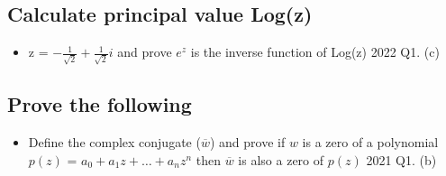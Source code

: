 \documentclass[a4paper, 10pt]{article}
\begin{document}
\subsection{Calculate principal value Log(z)}
\begin{itemize}
    \item z = $-\frac{1}{\sqrt{2}} + \frac{1}{\sqrt{2}} i$ and prove $e^z$ is the inverse function of Log(z) \hfill 2022 Q1. (c)
\end{itemize}
\subsection{Prove the following}
\begin{itemize}
    \item Define the complex conjugate ($\overline{w}$) and prove if $w$ is a zero of a polynomial $p(z)$ = $a_0 + a_1 z + \ldots + a_n z^n$ then $\overline{w}$ is also a zero of $p(z)$ \hfill 2021 Q1. (b)
\end{itemize}
\end{document}
